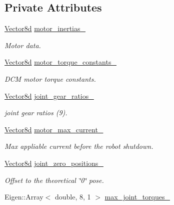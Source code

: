\subsection*{Private Attributes}
\begin{DoxyCompactItemize}
\item 
\hyperlink{common__header_8hpp_a98975ffbe0bca1296078e0350dfedd60}{Vector8d} \hyperlink{classblmc__robots_1_1Solo8TI_a59f11040a17d232823756c26c6b68145}{motor\+\_\+inertias\+\_\+}
\begin{DoxyCompactList}\small\item\em Motor data. \end{DoxyCompactList}\item 
\hyperlink{common__header_8hpp_a98975ffbe0bca1296078e0350dfedd60}{Vector8d} \hyperlink{classblmc__robots_1_1Solo8TI_ac2b9093468149839f7d6a6be43d108e7}{motor\+\_\+torque\+\_\+constants\+\_\+}
\begin{DoxyCompactList}\small\item\em D\+CM motor torque constants. \end{DoxyCompactList}\item 
\hyperlink{common__header_8hpp_a98975ffbe0bca1296078e0350dfedd60}{Vector8d} \hyperlink{classblmc__robots_1_1Solo8TI_a670ec9c986127612259d66e4f33d20b3}{joint\+\_\+gear\+\_\+ratios\+\_\+}
\begin{DoxyCompactList}\small\item\em joint gear ratios (9). \end{DoxyCompactList}\item 
\hyperlink{common__header_8hpp_a98975ffbe0bca1296078e0350dfedd60}{Vector8d} \hyperlink{classblmc__robots_1_1Solo8TI_afc3ba4524871faadbc1150f40e013f95}{motor\+\_\+max\+\_\+current\+\_\+}
\begin{DoxyCompactList}\small\item\em Max appliable current before the robot shutdown. \end{DoxyCompactList}\item 
\hyperlink{common__header_8hpp_a98975ffbe0bca1296078e0350dfedd60}{Vector8d} \hyperlink{classblmc__robots_1_1Solo8TI_a9dfb11213122b0a882dd54720ec719c3}{joint\+\_\+zero\+\_\+positions\+\_\+}
\begin{DoxyCompactList}\small\item\em Offset to the theoretical \char`\"{}0\char`\"{} pose. \end{DoxyCompactList}\item 
Eigen\+::\+Array$<$ double, 8, 1 $>$ \hyperlink{classblmc__robots_1_1Solo8TI_a9eca8246a28a6f2f2d1deff52228e69f}{max\+\_\+joint\+\_\+torques\+\_\+}\hypertarget{classblmc__robots_1_1Solo8TI_a9eca8246a28a6f2f2d1deff52228e69f}{}\label{classblmc__robots_1_1Solo8TI_a9eca8246a28a6f2f2d1deff52228e69f}


\end{DoxyCompactItemize}
